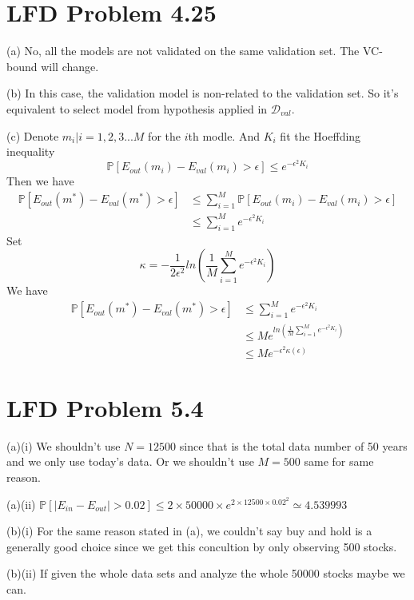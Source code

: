 \documentclass{article}
\begin{document}
\maketitle
\section{}
\section{LFD Problem 4.25}
\begin{tlist}{4}
  \item[(a)] No, all the models are not validated on the same validation set. The VC-bound will change.
  \item[(b)] In this case, the validation model is non-related to the validation set. So it's equivalent to select model from hypothesis applied in $\mathcal{D}_{val}$.
  \item[(c)] Denote $m_i|i=1,2,3...M$ for the $i$th modle. And $K_i$ fit the Hoeffding inequality $$\mathbb{P}[E_{out}(m_i)-E_{val}(m_i)>\epsilon]\leq e^{-\epsilon^2 K_i}$$ Then we have \begin{align*}
    \mathbb{P}[E_{out}(m^*)-E_{val}(m^*)>\epsilon]
    &\leq \sum_{i=1}^{M}\mathbb{P}[E_{out}(m_i)-E_{val}(m_i)>\epsilon]\\
    &\leq \sum_{i=1}^{M}e^{-\epsilon^2 K_i}
  \end{align*}
  Set $$\kappa=-\frac{1}{2\epsilon^2}ln\left(\frac{1}{M}\sum_{i=1}^Me^{-\epsilon^2 K_i}\right)$$
  We have \begin{align*}
    \mathbb{P}[E_{out}(m^*)-E_{val}(m^*)>\epsilon]
    &\leq \sum_{i=1}^{M}e^{-\epsilon^2 K_i}\\
    &\leq Me^{ln\left(\frac{1}{M}\sum_{i=1}^Me^{-\epsilon^2 K_i}\right)}\\
    &\leq Me^{-\epsilon^2\kappa(\epsilon)}
  \end{align*}
\end{tlist}
\section{LFD Problem 5.4}
\begin{tlist}{7}
  \item[(a)(i)] We shouldn't use $N=12500$ since that is the total data number of 50 years and we only use today's data. Or we shouldn't use $M=500$ same for same reason.
  \item[(a)(ii)] $\mathbb{P}[|E_{in}-E_{out}|>0.02]\leq 2\times 50000 \times e^{2\times 12500\times 0.02^2}\simeq 4.539993$
  \item[(b)(i)] For the same reason stated in (a), we couldn't say buy and hold is a generally good choice since we get this concultion by only observing 500 stocks.
  \item[(b)(ii)] If given the whole data sets and analyze the whole 50000 stocks maybe we can.
\end{tlist}
\end{document}
